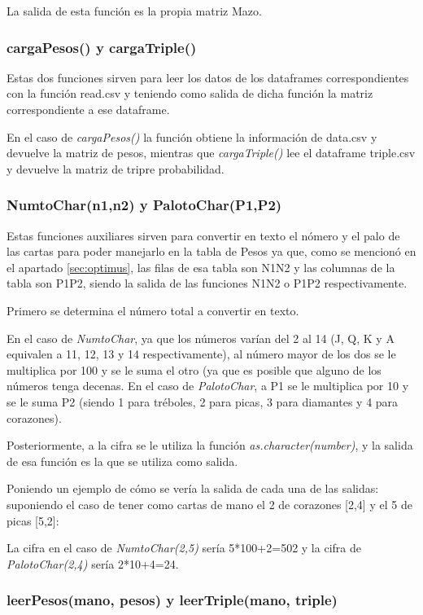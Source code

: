 La salida de esta función es la propia matriz Mazo.

\subsubsection{cargaPesos() y cargaTriple()}

Estas dos funciones sirven para leer los datos de los dataframes correspondientes con la función read.csv y teniendo como salida de dicha función la matriz correspondiente a ese dataframe.

En el caso de \textit{cargaPesos()} la función obtiene la información de data.csv y devuelve la matriz de pesos, mientras que \textit{cargaTriple()} lee el dataframe triple.csv y devuelve la matriz de tripre probabilidad.

\subsubsection{NumtoChar(n1,n2) y PalotoChar(P1,P2)}

Estas funciones auxiliares sirven para convertir en texto el nómero y el palo de las cartas para poder manejarlo en la tabla de Pesos ya que, como se mencionó en el apartado \ref{sec:optimus}, las filas de esa tabla son N1N2 y las columnas de la tabla son P1P2, siendo la salida de las funciones N1N2 o P1P2 respectivamente.

Primero se determina el número total a convertir en texto. 

En el caso de \textit{NumtoChar}, ya que los números varían del 2 al 14 (J, Q, K y A equivalen a 11, 12, 13 y 14 respectivamente), al número mayor de los dos se le multiplica por 100 y se le suma el otro (ya que es posible que alguno de los números tenga decenas. En el caso de \textit{PalotoChar}, a P1 se le multiplica por 10 y se le suma P2 (siendo 1 para tréboles, 2 para picas, 3 para diamantes y 4 para corazones).

Posteriormente, a la cifra se le utiliza la función \textit{as.character(number)}, y la salida de esa función es la que se utiliza como salida.

Poniendo un ejemplo de cómo se vería la salida de cada una de las salidas: suponiendo el caso de tener como cartas de mano el 2 de corazones [2,4] y el 5 de picas [5,2]:

La cifra en el caso de \textit{NumtoChar(2,5)} sería 5*100+2=502 y la cifra de \textit{PalotoChar(2,4)} sería 2*10+4=24.

\subsubsection{leerPesos(mano, pesos) y leerTriple(mano, triple)}

